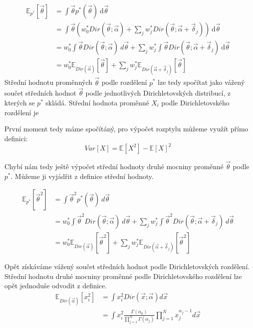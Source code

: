 \begin{align}
\mathbb{E}_{p^*}[\vec\theta] &= \int \vec\theta p^*(\vec\theta) ~ \mathrm{d}\vec\theta
\\
&= \int \vec\theta (
	w_0^* Dir(\vec{\theta}; \vec{\alpha}) +
	\sum_j w^*_j
        	Dir(\vec{\theta}; \vec{\alpha} + \vec{\delta}_j)
    ) ~ \mathrm{d}\vec\theta
\\
&= w_0^* \int \vec\theta Dir(\vec{\theta}; \vec{\alpha}) ~ d\vec\theta +
	\sum_j w_j^* \int \vec\theta Dir(\vec{\theta}; \vec{\alpha} + \vec{\delta}_j)
    ~ \mathrm{d}\vec\theta
\\
&= w_0^* \mathbb{E}_{Dir(\vec\alpha)}[\vec\theta] +
	\sum_j w_j^* \mathbb{E}_{Dir(\vec\alpha + \vec{\delta}_j)}[\vec\theta]
\end{align}
Střední hodnotu proměnných $\vec\theta$ podle rozdělení $p^*$ lze tedy spočítat
jako vážený součet středních hodnot $\vec\theta$ podle jednotlivých
Dirichletovských distribucí, z kterých se $p^*$ skládá.
Střední hodnota proměnné $X_i$ podle Dirichletovského rozdělení je

První moment tedy máme spočítáný, pro výpočet rozptylu můžeme využít přímo
definici:
\begin{equation}
	Var[X] = \mathbb{E}[X^2] - \mathbb{E}[X]^2
\end{equation}

Chybí nám tedy ještě výpočet střední hodnoty druhé mocniny proměnné
$\vec\theta$ podle $p^*$. Můžeme ji vyjádřit z definice střední hodnoty.

\begin{align}
\mathbb{E}_{p^*}[\vec\theta^2] &= \int \vec\theta^2 p^*(\vec\theta) ~ d\vec\theta
\\
&= w_0^* \int \vec\theta^2 Dir(\vec{\theta}; \vec{\alpha}) ~ d\vec\theta +
	\sum_j w_j^* \int \vec\theta^2 Dir(\vec{\theta}; \vec{\alpha} + \vec{\delta}_j)
	 ~ d\vec\theta
\\
&= w_0^* \mathbb{E}_{Dir(\vec\alpha)}[\vec\theta^2] +
	\sum_j w_j^* \mathbb{E}_{Dir(\vec\alpha + \vec{\delta}_j)}[\vec\theta^2]
\end{align}

Opět získáváme vážený součet středních hodnot podle Dirichletovských rozdělení.
Střední hodnotu druhé mocniny proměnné podle Dirichletovského rozdělení
lze opět jednoduše odvodit z definice.
\begin{align}
\mathbb{E}_{Dir(\vec\alpha)}[x_i^2] &=
	\int x_i^2 Dir(\vec x; \vec\alpha) d\vec x
\\
&=
	\int x_i^2 \frac{\Gamma(\alpha_0)}
			   {\prod_{j=1}^N \Gamma(\alpha_j)}
		\prod_{j=1}^N x_j^{\alpha_j - 1} d\vec x
\end{align}

